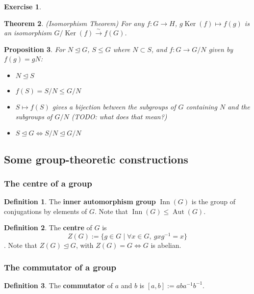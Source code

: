 \documentclass[12pt]{article}
\newtheorem{thm}{Theorem}[section]
\newtheorem{prop}[thm]{Proposition}
\theoremstyle{definition}
\newtheorem*{defn*}{Definition}
\newtheorem{exr}[thm]{Exercise}
\newcommand{\isoto}{\xrightarrow{\sim}}
\newcommand{\normsg}{\trianglelefteq}
\DeclareMathOperator{\Aut}{Aut}
\DeclareMathOperator{\Inn}{Inn}
\DeclareMathOperator{\Ker}{Ker}
\begin{document}
\begin{exr}
\end{exr}

\begin{thm}
  (Isomorphism Theorem)
  For any $f : G \to H$, $g\Ker(f) \mapsto f(g)$ is an isomorphism $G / \Ker(f) \isoto f(G)$.
\end{thm}

\begin{prop}
  For $N \normsg G$, $S \leq G$ where $N \subset S$, and $f : G \to G / N$ given by $f(g) = gN$:
  \begin{itemize}
    \item $N \normsg S$
    \item $f(S) = S / N \leq G / N$
    \item $S \mapsto f(S)$ gives a bijection between the subgroups of $G$ containing $N$ and the subgroups of $G / N$ (TODO: what does that mean?)
    \item $S \normsg G \iff S / N \normsg G / N$
  \end{itemize}
\end{prop}

\subsection{Some group-theoretic constructions}

\subsubsection{The centre of a group}

\begin{defn*}
  The \textbf{inner automorphism group} $\Inn(G)$ is the group of conjugations by elements of $G$.
  Note that $\Inn(G) \leq \Aut(G)$.
\end{defn*}

\begin{defn*}
  The \textbf{centre} of $G$ is
  $$Z(G) := \{ g \in G \mid \forall x \in G,\ gxg^{-1} = x \}$$.
  Note that $Z(G) \normsg G$, with $Z(G) = G \iff G$ is abelian.
\end{defn*}

\subsubsection{The commutator of a group}

\begin{defn*}
  The \textbf{commutator} of $a$ and $b$ is $[a, b] := aba^{-1}b^{-1}$.
\end{defn*}
\end{document}
